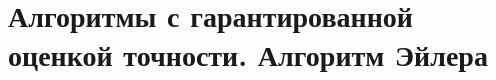\documentclass[discrete.tex]{subfiles}
\begin{document}
  \section{Алгоритмы с гарантированной оценкой точности. Алгоритм Эйлера}
\end{document}
